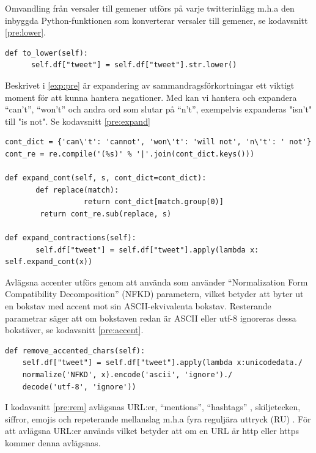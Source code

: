 \documentclass{kaumasters} %
\begin{document}
Omvandling från versaler till gemener utförs på varje twitterinlägg m.h.a den inbyggda Python-funktionen  som konverterar versaler till gemener, se kodavsnitt \ref{pre:lower}.
\begin{lstlisting}[style=mypython,caption={Funktion för att omvandla versaler till gemener.},label=pre:lower]
def to_lower(self):
      self.df["tweet"] = self.df["tweet"].str.lower()
\end{lstlisting}

Beskrivet i \ref{exp:pre} är expandering av sammandragsförkortningar ett viktigt moment för att kunna hantera negationer. Med  kan vi hantera och expandera “can’t”, “won’t” och andra ord som slutar på “n’t”, exempelvis expanderas "isn't" till "is not". Se kodavsnitt \ref{pre:expand}
\begin{lstlisting}[style=mypython,caption={Kod för att expandera sammandragsförkortningar.},label=pre:expand]
cont_dict = {'can\'t': 'cannot', 'won\'t': 'will not', 'n\'t': ' not'}
cont_re = re.compile('(%s)' % '|'.join(cont_dict.keys()))

def expand_cont(self, s, cont_dict=cont_dict):
       def replace(match):
                  return cont_dict[match.group(0)]
        return cont_re.sub(replace, s)

def expand_contractions(self):
       self.df["tweet"] = self.df["tweet"].apply(lambda x: self.expand_cont(x))
\end{lstlisting}

Avlägsna accenter utförs genom att använda  \cite{impl:005} som använder “Normalization Form Compatibility Decomposition” (NFKD) parametern, vilket betyder att  byter ut en bokstav med accent mot sin ASCII-ekvivalenta bokstav. Resterande parametrar säger att om bokstaven redan är ASCII eller utf-8 ignoreras dessa bokstäver, se kodavsnitt \ref{pre:accent}.
\begin{lstlisting}[style=mypython,caption={Funktion för att avlägsna accenter.},label=pre:accent]
def remove_accented_chars(self):
    self.df["tweet"] = self.df["tweet"].apply(lambda x:unicodedata./
    normalize('NFKD', x).encode('ascii', 'ignore')./
    decode('utf-8', 'ignore'))
\end{lstlisting}

I kodavsnitt \ref{pre:rem} avlägsnas URL:er, “mentions”, “hashtags” , skiljetecken, siffror, emojis och repeterande mellanslag m.h.a fyra reguljära uttryck (RU) \cite{impl:003}. För att avlägsna URL:er används  vilket betyder att om en URL är http eller https kommer denna avlägsnas.
\end{document}
